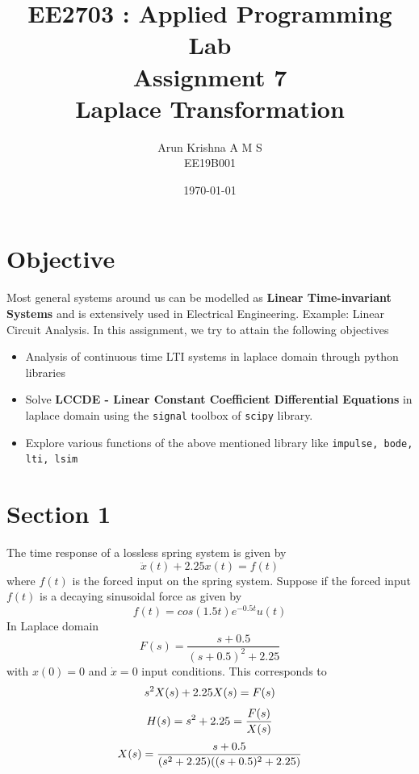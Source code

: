 \documentclass[12pt, a4paper]{report}
\title{\textbf{EE2703 : Applied Programming Lab \\ Assignment 7 \\ Laplace Transformation}} %
\author{Arun Krishna A M S \\ EE19B001} %
\date{\today} %
\begin{document}
		
		
\maketitle %
\justifying

\section*{Objective}
Most general systems around us can be modelled as \textbf{Linear Time-invariant Systems} and is extensively used in Electrical Engineering. Example: Linear Circuit Analysis. In this assignment, we try to attain the following objectives 

\begin{itemize}
  	\item Analysis of continuous time LTI systems in laplace domain through python libraries
    \item Solve \textbf{LCCDE - Linear Constant Coefficient Differential Equations} in laplace  domain using the \texttt{signal} toolbox of \texttt{scipy} library.
  	\item Explore various functions of the above mentioned library like \texttt{impulse, bode, lti, lsim}
\end{itemize}

\section*{Section 1}
The time response of a lossless spring system is given by
\begin{equation*}
\ddot{x}(t) + 2.25x(t) = f(t)
\end{equation*}
where $f(t)$ is the forced input on the spring system.
Suppose if the forced input $f(t)$ is a decaying sinusoidal force as given by
\begin{equation*}
f(t) = cos(1.5t)e^{-0.5t}u(t)
\end{equation*}
In Laplace domain
\begin{equation*}
F(s) = \frac{s + 0.5}{(s+0.5)^2 + 2.25}
\end{equation*}
with $x(0) = 0$ and $\dot{x} = 0$ input conditions. This corresponds to 
\begin{equation*}
s^2X(s) + 2.25X(s) = F(s)\\
\end{equation*}
\begin{equation*}
H(s) = s^2 + 2.25 = \frac{F(s)}{X(s)}\\
\end{equation*}
\begin{equation*}
X(s) = \frac{s+0.5}{(s^2 + 2.25)((s+0.5)^2 + 2.25)}\\
\end{equation*}
\end{document}
